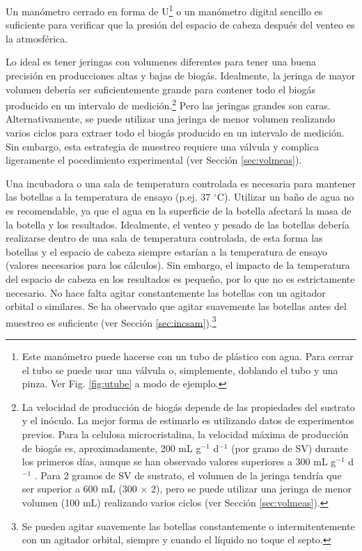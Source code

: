 \documentclass[]{article}
\begin{document}
Un manómetro cerrado en forma de U\footnote{
  Este manómetro puede hacerse con un tubo de plástico con agua. Para cerrar el tubo se puede usar una válvula o, simplemente, doblando el tubo y una pinza. Ver Fig. \ref{fig:utube} a modo de ejemplo.  
} o un manómetro digital sencillo es suficiente para verificar que la presión del espacio de cabeza después del venteo es la atmosférica.

Lo ideal es tener jeringas con volumenes diferentes para tener una buena precisión en producciones altas y bajas de biogás. Idealmente, la jeringa de mayor volumen debería ser suficientemente grande para contener todo el biogás producido en un intervalo de medición.\footnote{
\label{fn:cellrate}
  La velocidad de producción de biogás depende de las propiedades del sustrato y el inóculo. La mejor forma de estimarlo es utilizando datos de experimentos previos.
  Para la celulosa microcristalina, la velocidad máxima de producción de biogás es, aproximadamente, 200 mL g$^{-1}$ d$^{-1}$ (por gramo de SV) durante los primeros días, aunque se han observado valores superiores a 300 mL g$^{-1}$ d$^{-1}$ \citep{hafnerImprovingInterlaboratoryReproducibility2020}.
  Para 2 gramos de SV de sustrato, el volumen de la jeringa tendría que ser superior a 600 mL (300 $\times$ 2), pero se puede utilizar una jeringa de menor volumen (100 mL) realizando varios ciclos (ver Sección \ref{sec:volmeas}).
}
Pero las jeringas grandes son caras. Alternativamente, se puede utilizar una jeringa de menor volumen realizando varios ciclos para extraer todo el biogás producido en un intervalo de medición.
Sin embargo, esta estrategia de muestreo requiere una válvula y complica ligeramente el pocedimiento experimental (ver Sección \ref{sec:volmeas}).

Una incubadora o una sala de temperatura controlada es necesaria para mantener las botellas a la temperatura de ensayo (p.ej. 37 $^\circ$C).
Utilizar un baño de agua no es recomendable, ya que el agua en la superficie de la botella afectará la masa de la botella y los resultados.
Idealmente, el venteo y pesado de las botellas debería realizarse dentro de una sala de temperatura controlada, de esta forma las botellas y el espacio de cabeza siempre estarían a la temperatura de ensayo (valores necesarios para los cálculos).
Sin embargo, el impacto de la temperatura del espacio de cabeza en los resultados es pequeño, por lo que no es estrictamente necesario.
No hace falta agitar constantemente las botellas con un agitador orbital o similares. Se ha observado que agitar suavemente las botellas antes del muestreo es suficiente (ver Sección \ref{sec:incsam}).\footnote{Se pueden agitar suavemente las botellas constantemente o intermitentemente con un agitador orbital, siempre y cuando el líquido no toque el septo.}
\end{document}
